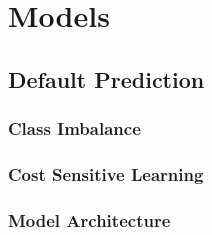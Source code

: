 \chapter{Models}

    \section{Default Prediction}
    
        \subsection{Class Imbalance}
        
        \subsection{Cost Sensitive Learning}
        
        \subsection{Model Architecture}
